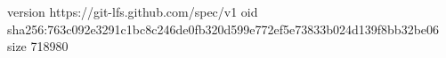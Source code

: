 version https://git-lfs.github.com/spec/v1
oid sha256:763c092e3291c1bc8c246de0fb320d599e772ef5e73833b024d139f8bb32be06
size 718980
